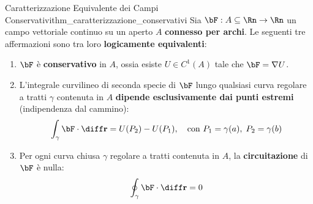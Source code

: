 \begin{teorema}{Caratterizzazione Equivalente dei Campi Conservativi}{thm_caratterizzazione_conservativi}
Sia $\bF: A \subseteq \Rn \to \Rn$ un campo vettoriale continuo su un aperto $A$ \textbf{connesso per archi}. Le seguenti tre affermazioni sono tra loro \textbf{logicamente equivalenti}:
\begin{enumerate}[label=(\Roman*)]
    \item $\bF$ è \textbf{conservativo} in $A$, ossia esiste $U \in C^1(A)$ tale che $\bF = \nabla U$.
    \item L'integrale curvilineo di seconda specie di $\bF$ lungo qualsiasi curva regolare a tratti $\gamma$ contenuta in $A$ \textbf{dipende esclusivamente dai punti estremi} (indipendenza dal cammino):
    \[
    \int_\gamma \bF \cdot \diff\mathbf{r} = U(P_2) - U(P_1), \quad \text{con } P_1 = \gamma(a), \; P_2 = \gamma(b)
    \]
    \item Per ogni curva chiusa $\gamma$ regolare a tratti contenuta in $A$, la \textbf{circuitazione} di $\bF$ è nulla:
    \[
    \oint_\gamma \bF \cdot \diff\mathbf{r} = 0
    \]
\end{enumerate}
\end{teorema}

